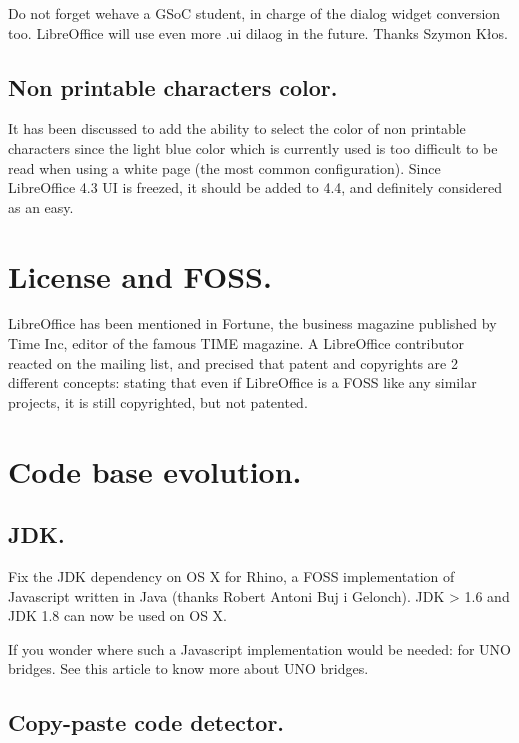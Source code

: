 \documentclass{article}
\begin{document}
Do not forget wehave a GSoC student, in charge of the dialog widget conversion too\cite{gsocDialogConversion}. LibreOffice will use even more .ui dilaog in the future. Thanks Szymon Kłos.

\subsection{Non printable characters color.}

It has been discussed to add the ability to select the color of non printable characters since the light blue color which is currently used is too difficult to be read when using a white page (the most common configuration)\cite{lightBlueCharacter}. Since LibreOffice 4.3 UI is freezed, it should be added to 4.4, and definitely considered as an easy\cite{lightBlueCharacterEasyHackProposal}.



\section{License and FOSS.}

LibreOffice has been mentioned in Fortune\cite{fortuneTime}, the business magazine published by Time Inc, editor of the famous TIME magazine. A LibreOffice contributor reacted on the mailing list\cite{fortuneTimeReaction}, and precised that patent and copyrights are 2 different concepts: stating that even if LibreOffice is a FOSS like any similar projects, it is still copyrighted, but not patented. 



\section{Code base evolution.}

\subsection{JDK.}

Fix the JDK dependency on OS X for Rhino\cite{javaDepRhino1}\cite{javaDepRhino2}, a FOSS implementation of Javascript written in Java\cite{rhinoDefinition} (thanks Robert Antoni Buj i Gelonch). JDK > 1.6 and JDK 1.8 can now be used on OS X.

If you wonder where such a Javascript implementation would be needed: for UNO bridges. See this article to know more about UNO bridges\cite{unoBridges}.

\subsection{Copy-paste code detector.}
\end{document}
